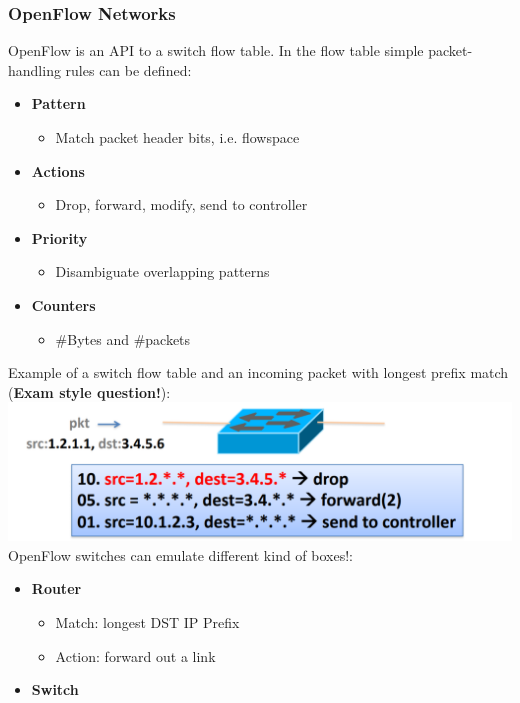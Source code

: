 \documentclass[a4paper, fontsize=8pt, landscape, DIV=1]{scrartcl}
\begin{document}
\begin{multicols*}{4}
		\subsubsection{OpenFlow Networks}
		OpenFlow is an API to a switch flow table. In the flow table simple packet-handling rules can be defined: 
		\begin{itemize}[noitemsep]
			\item \textbf{Pattern}
			\begin{itemize}
				\item Match packet header bits, i.e. flowspace
			\end{itemize}
			\item \textbf{Actions}
			\begin{itemize}
				\item Drop, forward, modify, send to controller
			\end{itemize}
			\item \textbf{Priority}
			\begin{itemize}
				\item Disambiguate overlapping patterns
			\end{itemize}
			\item \textbf{Counters}
			\begin{itemize}
				\item \#Bytes and \#packets
			\end{itemize}
		\end{itemize}
		Example of a switch flow table and an incoming packet with longest prefix match (\textbf{Exam style question!}):\\
		\includegraphics[width=\columnwidth]{images/Programmable_Networks/flow_table.png}
		OpenFlow switches can emulate different kind of boxes!:
		\begin{itemize}[noitemsep]
			\item \textbf{Router}
			\begin{itemize}
				\item Match: longest DST IP Prefix
				\item Action: forward out a link
			\end{itemize}
			\item \textbf{Switch}

\end{itemize}
\end{multicols*}
\end{document}
